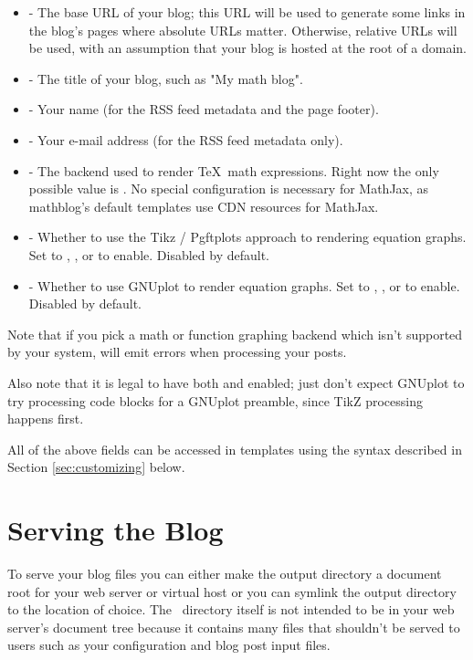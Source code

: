 \documentclass[11pt, letterpaper, oneside, titlepage]{book}
\begin{document}
\begin{itemize}
\item{ - The base URL of your blog; this URL will be used
  to generate some links in the blog's pages where absolute URLs
  matter.  Otherwise, relative URLs will be used, with an assumption
  that your blog is hosted at the root of a domain.}
\item{ - The title of your blog, such as "My math blog".}
\item{ - Your name (for the RSS feed metadata and the
  page footer).}
\item{ - Your e-mail address (for the RSS feed
  metadata only).}
\item{ - The backend used to render \TeX\ math
  expressions.  Right now the only possible value is .  No
  special configuration is necessary for MathJax, as mathblog's
  default templates use CDN resources for MathJax.}
\item{ - Whether to use the Tikz / Pgftplots approach to
  rendering equation graphs.  Set to , , or  to
  enable.  Disabled by default.}
\item{ - Whether to use GNUplot to render equation graphs.
  Set to , , or  to enable.  Disabled by
  default.}
\end{itemize}

Note that if you pick a math or function graphing backend which isn't
supported by your system,  will emit errors when processing
your posts.

Also note that it is legal to have both  and 
enabled; just don't expect GNUplot to try processing code blocks for a
 GNUplot preamble, since TikZ processing happens first.

All of the above fields can be accessed in templates using the syntax
described in Section \ref{sec:customizing} below.

\section{Serving the Blog}

To serve your blog files you can either make the output directory a
document root for your web server or virtual host or you can symlink
the output directory to the location of choice.  The
\mathblog\ directory itself is not intended to be in your web server's
document tree because it contains many files that shouldn't be served
to users such as your configuration and blog post input files.
\end{document}
